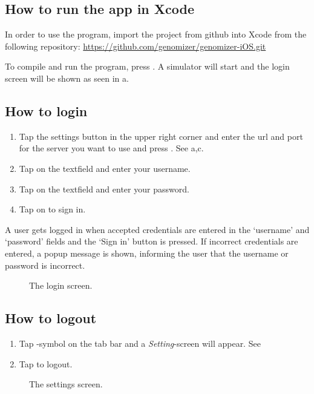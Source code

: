 \subsection{How to run the app in Xcode}
In order to use the program, import the project from github into Xcode from the following repository:
\url{https://github.com/genomizer/genomizer-iOS.git} 

To compile and run the program, press . A simulator will start and the login screen will be shown as seen in a.

\subsection{How to login}

\begin{enumerate}
\item Tap the settings button in the upper right corner and enter the url and port for the server you want to use and press . See a,c.
\item Tap on the  textfield and enter your username.
\item Tap on the  textfield and enter your password.
\item Tap on  to sign in.
\end{enumerate}
A user gets logged in when accepted credentials are entered in the ‘username’ and ‘password’ fields and the ‘Sign in’ button is pressed. If incorrect credentials are entered, a popup message is shown, informing the user that the username or password is incorrect.

\begin{figure}[ht]
\caption{The login screen.}
\label{fig:ios_login}
\end{figure}
\FloatBarrier

\subsection{How to logout}
\begin{enumerate}
\item Tap -symbol on the tab bar and a \emph{Setting}-screen will appear. See 
\item Tap  to logout.
\end{enumerate}

\begin{figure}[htb]
\caption{The settings screen.}
\label{fig:ios_more}
\end{figure}
\FloatBarrier

